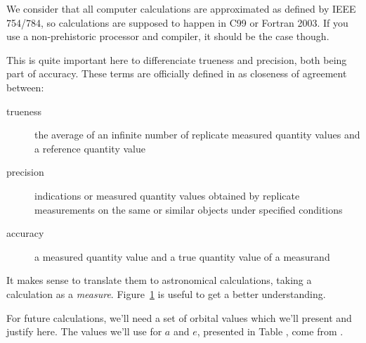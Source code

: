 We consider that all computer calculations are approximated as defined by IEEE 754/784, so calculations are supposed to happen in C99 or Fortran 2003. If you use a non-prehistoric processor and compiler, it should be the case though.



This is quite important here to differenciate trueness and precision, both being part of accuracy. These terms are officially defined in \cite{VIM} as closeness of agreement between:

\begin{description}
\item[trueness] the average of an infinite number of replicate measured quantity values and a reference quantity value
\item[precision] indications or measured quantity values obtained by replicate measurements on the same or similar objects under specified conditions
\item[accuracy] a measured quantity value and a true quantity value of a measurand
\end{description}

It makes sense to translate them to astronomical calculations, taking a calculation as a \emph{measure}. Figure~\ref{ATP} is useful to get a better understanding.

\begin{figure}[h]
\centering
\def\svgwidth{10cm}

\label{ATP}
\end{figure}



For future calculations, we'll need a set of orbital values which we'll present and justify here. The values we'll use for $a$ and $e$, presented in Table \cite{table:planetorbitalvalues}, come from \cite{NASA-factsheet}. %

